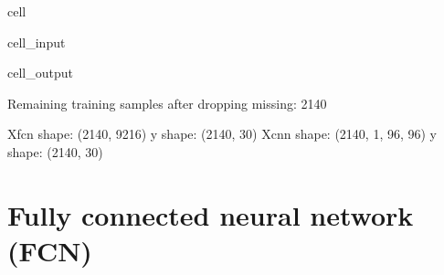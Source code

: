 \documentclass[letterpaper,10pt,english]{jupyterBook}
\begin{document}
\begin{sphinxuseclass}{cell}
\begin{sphinxVerbatimInput}
\begin{sphinxuseclass}{cell_input}
\begin{sphinxVerbatim}[commandchars=\\\{\}]
  \PYG{p}{[}\PYG{p}{[}\PYG{p}{]}\PYG{p}{]}  
  
   
   
\end{sphinxVerbatim}

\end{sphinxuseclass}\end{sphinxVerbatimInput}
\begin{sphinxVerbatimOutput}

\begin{sphinxuseclass}{cell_output}
\begin{sphinxVerbatim}[commandchars=\\\{\}]
Remaining training samples after dropping missing: 2140
\end{sphinxVerbatim}

\begin{sphinxVerbatim}[commandchars=\\\{\}]
X\PYGZus{}fcn shape: (2140, 9216) y shape: (2140, 30)
X\PYGZus{}cnn shape: (2140, 1, 96, 96) y shape: (2140, 30)
\end{sphinxVerbatim}

\end{sphinxuseclass}\end{sphinxVerbatimOutput}

\end{sphinxuseclass}

\section{Fully connected neural network (FCN)}
\label{\detokenize{04:fully-connected-neural-network-fcn}}
\end{document}
